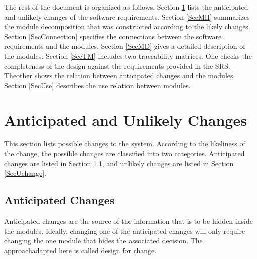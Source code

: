 \documentclass[12pt, titlepage]{article}
\begin{document}
The rest of the document is organized as follows. Section
\ref{SecChange} lists the anticipated and unlikely changes of the software
requirements. Section \ref{SecMH} summarizes the module decomposition that
was constructed according to the likely changes. Section \ref{SecConnection}
specifies the connections between the software requirements and the
modules. Section \ref{SecMD} gives a detailed description of the
modules. Section \ref{SecTM} includes two traceability matrices. One checks
the completeness of the design against the requirements provided in the SRS.
Theother shows the relation between anticipated changes and the modules. Section
\ref{SecUse} describes the use relation between modules.

\section{Anticipated and Unlikely Changes} \label{SecChange}

This section lists possible changes to the system. According to the likeliness
of the change, the possible changes are classified into two
categories. Anticipated changes are listed in Section \ref{SecAchange}, and
unlikely changes are listed in Section \ref{SecUchange}.

\subsection{Anticipated Changes} \label{SecAchange}

Anticipated changes are the source of the information that is to be hidden
inside the modules. Ideally, changing one of the anticipated changes will only
require changing the one module that hides the associated decision. The
approachadapted here is called design for
change.
\end{document}
